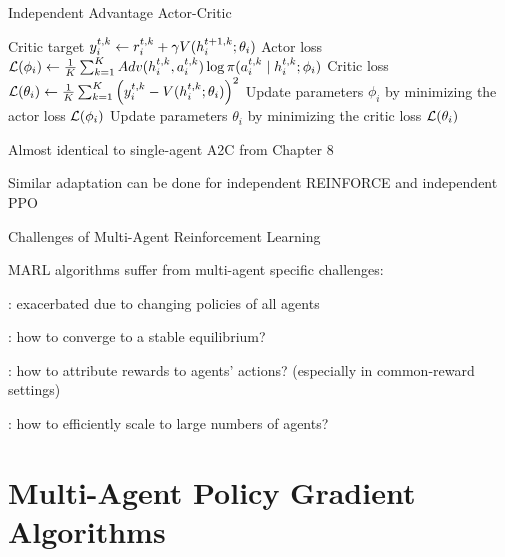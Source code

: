 \begin{frame}[t]{Independent Advantage Actor-Critic}
{\begin{minipage}{0.95\linewidth}
                                \State Critic target $y^{t,k}_i \gets r^{t,k}_i + \gamma V(h^{t+1,k}_i; \theta_i)$
                            \EndIf
                            \State Actor loss $\mathcal{L}(\phi_i) \gets \frac{1}{K} \sum_{k=1}^K Adv(h^{t,k}_i, a^{t,k}_i) \log \pi(a^{t,k}_i \mid h^{t,k}_i; \phi_i)$
                            \State Critic loss $\mathcal{L}(\theta_i) \gets \frac{1}{K} \sum_{k=1}^K \left(y^{t,k}_i - V(h^{t,k}_i; \theta_i)\right)^2$
                            \State Update parameters $\phi_i$ by minimizing the actor loss $\mathcal{L}(\phi_i)$
                            \State Update parameters $\theta_i$ by minimizing the critic loss $\mathcal{L}(\theta_i)$
                        \EndFor
                    \EndFor
            \ealg
        \end{minipage}
    }
    \hfill
    \begin{minipage}{0.38\textwidth}
        \blist
            \item<2-> Almost identical to single-agent A2C from Chapter 8
            \item<3-> Similar adaptation can be done for independent REINFORCE and independent PPO
        \elist
    \end{minipage}
\end{frame}

\begin{frame}[t]{Challenges of Multi-Agent Reinforcement Learning}
    \begin{reminderbox}
        MARL algorithms suffer from multi-agent specific challenges:
        \blist
            \item {}: exacerbated due to changing policies of all agents
            \item {}: how to converge to a stable equilibrium?
            \item {}: how to attribute rewards to agents' actions? (especially in common-reward settings)
            \item {}: how to efficiently scale to large numbers of agents?
        \elist
    \end{reminderbox}

\end{frame}

\section{Multi-Agent Policy Gradient Algorithms}

